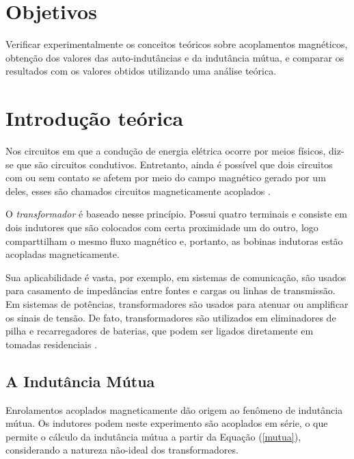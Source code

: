 \documentclass[a4paper,12pt,oneside,openany,table,xcdraw]{article}
\begin{document}
\newcommand{\thedepartment}{Faculdade de Engenharia Elétrica}
\newcommand{\thecourse}{FEELT}
\newcommand{\thetitle}{CIRCUITOS ACOPLADOS MAGNETICAMENTE}
\newcommand{\thetype}{Relatório da Disciplina de Circuitos Elétricos II}
\newcommand{\theproftitle}{Bacharel em Engenharia Elétrica}
\newcommand{\thestudent}{Lesly Viviane Montúfar Berrios\\
\centering11811ETE001}
\newcommand{\theadvisor}{Prof. Wellington Maycon Santos Bernardes}
\newcommand{\thecity}{Uberlândia}

\thispagestyle{empty}


\onehalfspacing
\tableofcontents %
\newpage

\section{Objetivos} %
Verificar experimentalmente os conceitos teóricos sobre acoplamentos magnéticos,
obtenção dos valores das auto-indutâncias e da indutância mútua, e comparar os resultados
com os valores obtidos utilizando uma análise teórica.

\section{Introdução teórica} %
Nos circuitos em que a condução de energia elétrica ocorre por meios físicos, diz-se que são circuitos condutivos. Entretanto, ainda é possível que dois circuitos com ou sem contato se afetem por meio do campo magnético gerado por um deles, esses são chamados circuitos magneticamente acoplados \cite{ph}.

O \emph{transformador} é baseado nesse princípio. Possui quatro terminais e consiste em dois indutores que são colocados com certa proximidade um do outro, logo comparttilham o mesmo fluxo magnético e, portanto, as bobinas indutoras estão acopladas magneticamente. 

Sua aplicabilidade é vasta, por exemplo, em sistemas de comunicação, são usados para casamento de impedâncias entre fontes e cargas ou linhas de transmissão. Em sistemas de potências, transformadores são usados para atenuar ou amplificar os sinais de tensão. De fato, transformadores são utilizados em eliminadores de pilha e recarregadores de baterias, que podem ser ligados diretamente em tomadas residenciais \cite{irwin}.

\subsection{A Indutância Mútua}
 Enrolamentos acoplados magneticamente dão origem ao fenômeno de indutância mútua. Os indutores podem neste experimento são acoplados em série, o que permite o cálculo da indutância mútua a partir da Equação (\ref{mutua}), considerando a natureza não-ideal dos transformadores.
\end{document}

